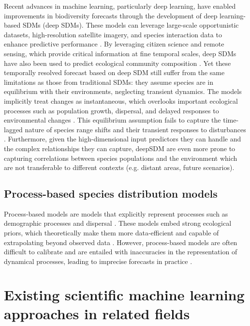 Recent advances in machine learning, particularly deep learning, have enabled improvements in biodiversity forecasts through the development of deep learning-based SDMs (deep SDMs). These models can leverage large-scale opportunistic datasets, high-resolution satellite imagery, and species interaction data to enhance predictive performance \cite{brun2024, cole2023, Deneu2021, zbinden2024on}. 
By leveraging citizen science and remote sensing, which provide critical information at fine temporal scales, deep SDMs have also been used to predict ecological community composition \cite{gillespie2024,dollinger2024,hu2025introduction}.
% 
Yet these temporally resolved forecast based on deep SDM still suffer from the same limitations as those from traditional SDMs: they assume species are in equilibrium with their environments, neglecting transient dynamics. The models implicitly treat changes as instantaneous, which overlooks important ecological processes such as population growth, dispersal, and delayed responses to environmental changes \cite{isaac2014, zurell}. This equilibrium assumption fails to capture the time-lagged nature of species range shifts and their transient responses to disturbances \cite{barber-omalley2022}. Furthermore, given the high-dimensional input predictors they can handle and the complex relationships they can capture, deepSDM are even more prone to capturing correlations between species populations and the environment which are not transferable to different contexts (e.g. distant areas, future scenarios).

\subsection{Process-based species distribution models}
Process-based models are models that explicitly represent processes such as demographic processes and dispersal \cite{cantrell2004, bonneau2016}. These models embed strong ecological priors, which theoretically make them more data-efficient and capable of extrapolating beyond observed data \cite{cabral2017, briscoe2019}. However, process-based models are often difficult to calibrate and are entailed with inaccuracies in the representation of dynamical processes, leading to imprecise forecasts in practice \cite{evans2016a, connolly2017, Scheiter2013, boussange2024}.


\section{Existing scientific machine learning approaches in related fields}

